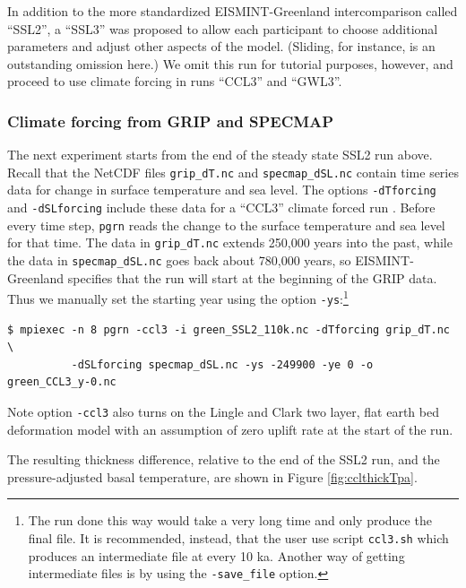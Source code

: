 \documentclass[11pt,final]{amsart}
\begin{document}
In addition to the more standardized EISMINT-Greenland intercomparison called ``SSL2'', a ``SSL3'' was proposed to allow each participant to choose additional parameters and adjust other aspects of the model.  (Sliding, for instance, is an outstanding omission here.)  We omit this run for tutorial purposes, however, and proceed to use climate forcing in runs ``CCL3'' and ``GWL3''.


\subsubsection*{Climate forcing from GRIP and SPECMAP} 
\label{sec:climate-forcing}
The next experiment starts from the end of the steady state SSL2 run above.  Recall that the NetCDF files \verb|grip_dT.nc| and \verb|specmap_dSL.nc| contain time series data for change in surface temperature and sea level.  The options \verb|-dTforcing| and \verb|-dSLforcing| include these data for a ``CCL3'' climate forced run \cite{RitzEISMINT,HuybrechtsEISMINT}.  Before every time step, \verb|pgrn| reads the change to the surface temperature and sea level for that time.  The data in \verb|grip_dT.nc| extends 250,000 years into the past, while the data in \verb|specmap_dSL.nc| goes back about 780,000 years, so EISMINT-Greenland specifies that the run will start at the beginning of the GRIP data.  Thus we manually set the starting year using the option \verb|-ys|:\footnote{The run done this way would take a very long time and only produce the final file.  It is recommended, instead, that the user use script \texttt{ccl3.sh} which produces an intermediate file at every 10 ka.  Another way of getting intermediate files is by using the \texttt{-save\_file} option.}

\begin{verbatim}
$ mpiexec -n 8 pgrn -ccl3 -i green_SSL2_110k.nc -dTforcing grip_dT.nc \
          -dSLforcing specmap_dSL.nc -ys -249900 -ye 0 -o green_CCL3_y-0.nc
\end{verbatim}
\noindent Note option \verb|-ccl3| also turns on the Lingle and Clark \cite{BLKfastearth,LingleClark} two layer, flat earth bed deformation model with an assumption of zero uplift rate at the start of the run.

The resulting thickness difference, relative to the end of the SSL2 run, and the pressure-adjusted basal temperature, are shown in Figure \ref{fig:cclthickTpa}.
\end{document}
